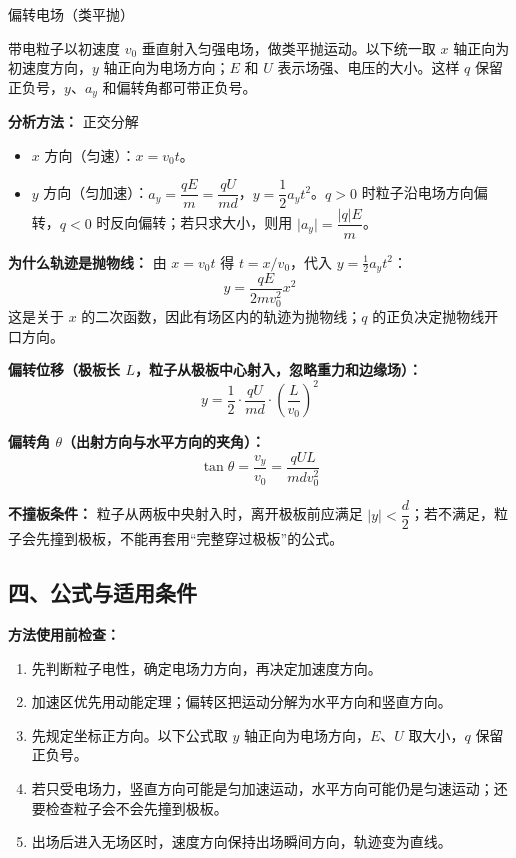 \begin{conceptbox}{偏转电场（类平抛）}

带电粒子以初速度 $v_0$ 垂直射入匀强电场，做类平抛运动。以下统一取 $x$ 轴正向为初速度方向，$y$ 轴正向为电场方向；$E$ 和 $U$ 表示场强、电压的大小。这样 $q$ 保留正负号，$y$、$a_y$ 和偏转角都可带正负号。

\begin{center}


\label{fig:deflection-field}
\end{center}

\textbf{分析方法：} 正交分解
\begin{itemize}
  \item $x$ 方向（匀速）：$x = v_0 t$。
  \item $y$ 方向（匀加速）：$a_y = \dfrac{qE}{m} = \dfrac{qU}{md}$，$y = \dfrac12 a_y t^2$。$q>0$ 时粒子沿电场方向偏转，$q<0$ 时反向偏转；若只求大小，则用 $\lvert a_y\rvert=\dfrac{|q|E}{m}$。
\end{itemize}

\textbf{为什么轨迹是抛物线：} 由 $x=v_0t$ 得
$t=x/v_0$，代入 $y=\frac12a_yt^2$：
\[
\boxed{y=\frac{qE}{2mv_0^2}x^2}
\]
这是关于 $x$ 的二次函数，因此有场区内的轨迹为抛物线；$q$ 的正负决定抛物线开口方向。

\textbf{偏转位移（极板长 $L$，粒子从极板中心射入，忽略重力和边缘场）：}
\[
y = \frac12 \cdot \frac{qU}{md} \cdot \left(\frac{L}{v_0}\right)^2
\]

\textbf{偏转角 $\theta$（出射方向与水平方向的夹角）：}
\[
\tan\theta = \frac{v_y}{v_0} = \frac{qUL}{md v_0^2}
\]

\textbf{不撞板条件：} 粒子从两板中央射入时，离开极板前应满足 $\lvert y\rvert<\dfrac{d}{2}$；若不满足，粒子会先撞到极板，不能再套用“完整穿过极板”的公式。

\end{conceptbox}

\begin{samepage}
\section*{四、公式与适用条件}

\textbf{方法使用前检查：}
\nopagebreak[4]
\begin{enumerate}
  \item 先判断粒子电性，确定电场力方向，再决定加速度方向。
  \item 加速区优先用动能定理；偏转区把运动分解为水平方向和竖直方向。
  \item 先规定坐标正方向。以下公式取 $y$ 轴正向为电场方向，$E$、$U$ 取大小，$q$ 保留正负号。
  \item 若只受电场力，竖直方向可能是匀加速运动，水平方向可能仍是匀速运动；还要检查粒子会不会先撞到极板。
  \item 出场后进入无场区时，速度方向保持出场瞬间方向，轨迹变为直线。
\end{enumerate}
\end{samepage}

